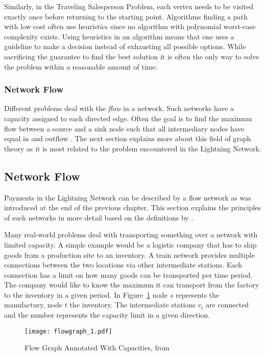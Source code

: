 \documentclass[final]{fhnwreport}       %
\begin{document}
Similarly, in the Traveling Salesperson Problem, each vertex needs to be visited exactly once before returning to the starting point. Algorithms finding a path with low cost often use heuristics since no algorithm with polynomial worst-case complexity exists. Using heuristics in an algorithm means that one uses a guideline to make a decision instead of exhausting all possible options. While sacrificing the guarantee to find the best solution it is often the only way to solve the problem within a reasonable amount of time.

\subsubsection{Network Flow}
Different problems deal with the \emph{flow} in a network. Such networks have a capacity assigned to each directed edge. Often the goal is to find the maximum flow between a source and a sink node such that all intermediary nodes have equal in and outflow \citep{even_network_1975}. The next section explains more about this field of graph theory as it is most related to the problem encountered in the Lightning Network.

\subsection{Network Flow}\label{subsec:flow}
Payments in the Lightning Network can be described by a flow network as was introduced at the end of the previous chapter. This section explains the principles of such networks in more detail based on the definitions by \cite{wilson_introduction_2010}.

Many real-world problems deal with transporting something over a network with limited capacity. A simple example would be a logistic company that has to ship goods from a production site to an inventory. A train network provides multiple connections between the two locations via other intermediate stations. Each connection has a limit on how many goods can be transported per time period. The company would like to know the maximum it can transport from the factory to the inventory in a given period. In Figure~\ref{fig:flow_graph} node $s$ represents the manufactury, node $t$ the inventory. The intermediate stations $v_i$ are connected and the number represents the capacity limit in a given direction.

\begin{figure}[H]
\centering
\texttt{[image: flowgraph\_1.pdf]}
\caption{Flow Graph Annotated With Capacities, from \cite{brossard_graph_2010}}
\label{fig:flow_graph}
\end{figure}
\end{document}
